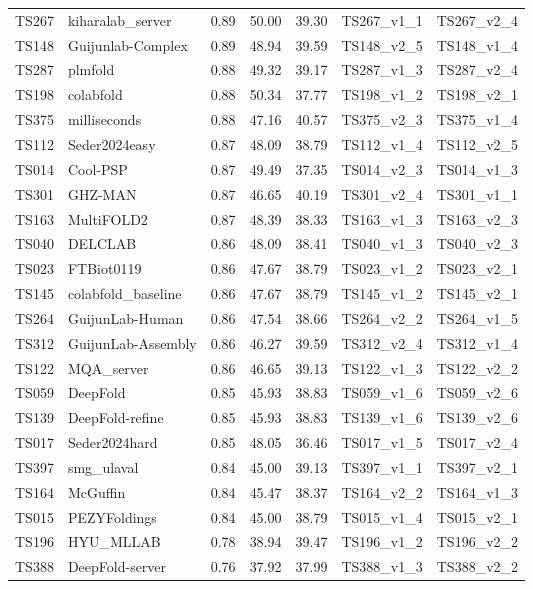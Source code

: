 \begin{table}[ht]
{\begin{tabular}{llrrrll}
TS267 & kiharalab\_server & 0.89 & 50.00 & 39.30 & TS267\_v1\_1 & TS267\_v2\_4 \\ 
TS148 & Guijunlab-Complex & 0.89 & 48.94 & 39.59 & TS148\_v2\_5 & TS148\_v1\_4 \\ 
TS287 & plmfold & 0.88 & 49.32 & 39.17 & TS287\_v1\_3 & TS287\_v2\_4 \\ 
TS198 & colabfold & 0.88 & 50.34 & 37.77 & TS198\_v1\_2 & TS198\_v2\_1 \\ 
TS375 & milliseconds & 0.88 & 47.16 & 40.57 & TS375\_v2\_3 & TS375\_v1\_4 \\ 
TS112 & Seder2024easy & 0.87 & 48.09 & 38.79 & TS112\_v1\_4 & TS112\_v2\_5 \\ 
TS014 & Cool-PSP & 0.87 & 49.49 & 37.35 & TS014\_v2\_3 & TS014\_v1\_3 \\ 
TS301 & GHZ-MAN & 0.87 & 46.65 & 40.19 & TS301\_v2\_4 & TS301\_v1\_1 \\ 
TS163 & MultiFOLD2 & 0.87 & 48.39 & 38.33 & TS163\_v1\_3 & TS163\_v2\_3 \\ 
TS040 & DELCLAB & 0.86 & 48.09 & 38.41 & TS040\_v1\_3 & TS040\_v2\_3 \\ 
TS023 & FTBiot0119 & 0.86 & 47.67 & 38.79 & TS023\_v1\_2 & TS023\_v2\_1 \\ 
TS145 & colabfold\_baseline & 0.86 & 47.67 & 38.79 & TS145\_v1\_2 & TS145\_v2\_1 \\ 
TS264 & GuijunLab-Human & 0.86 & 47.54 & 38.66 & TS264\_v2\_2 & TS264\_v1\_5 \\ 
TS312 & GuijunLab-Assembly & 0.86 & 46.27 & 39.59 & TS312\_v2\_4 & TS312\_v1\_4 \\ 
TS122 & MQA\_server & 0.86 & 46.65 & 39.13 & TS122\_v1\_3 & TS122\_v2\_2 \\ 
TS059 & DeepFold & 0.85 & 45.93 & 38.83 & TS059\_v1\_6 & TS059\_v2\_6 \\ 
TS139 & DeepFold-refine & 0.85 & 45.93 & 38.83 & TS139\_v1\_6 & TS139\_v2\_6 \\ 
TS017 & Seder2024hard & 0.85 & 48.05 & 36.46 & TS017\_v1\_5 & TS017\_v2\_4 \\ 
TS397 & smg\_ulaval & 0.84 & 45.00 & 39.13 & TS397\_v1\_1 & TS397\_v2\_1 \\ 
TS164 & McGuffin & 0.84 & 45.47 & 38.37 & TS164\_v2\_2 & TS164\_v1\_3 \\ 
TS015 & PEZYFoldings & 0.84 & 45.00 & 38.79 & TS015\_v1\_4 & TS015\_v2\_1 \\ 
TS196 & HYU\_MLLAB & 0.78 & 38.94 & 39.47 & TS196\_v1\_2 & TS196\_v2\_2 \\ 
TS388 & DeepFold-server & 0.76 & 37.92 & 37.99 & TS388\_v1\_3 & TS388\_v2\_2 \\ 

\end{tabular}}
\end{table}
